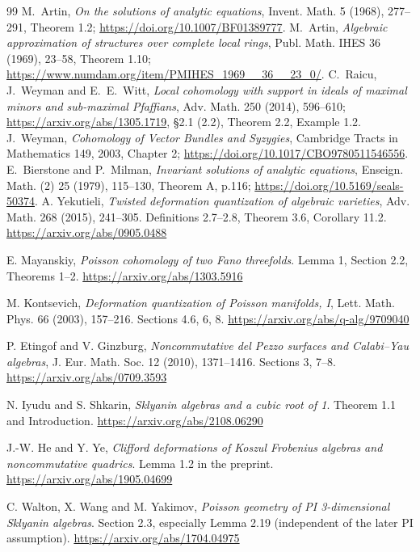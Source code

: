 \documentclass[a4paper,11pt]{ltjsarticle}
\theoremstyle{definition}
\begin{document}

\begin{thebibliography}{99}
\small
{} M.~Artin, \emph{On the solutions of analytic equations},
Invent. Math. 5 (1968), 277--291, Theorem 1.2;
\url{https://doi.org/10.1007/BF01389777}.
 M.~Artin, \emph{Algebraic approximation of structures over complete local rings},
Publ. Math. IHES 36 (1969), 23--58, Theorem 1.10;
\url{https://www.numdam.org/item/PMIHES_1969__36__23_0/}.
 C.~Raicu, J.~Weyman and E.~E.~Witt,
\emph{Local cohomology with support in ideals of maximal minors and sub-maximal Pfaffians},
Adv. Math. 250 (2014), 596--610; \url{https://arxiv.org/abs/1305.1719},
\S2.1 (2.2), Theorem 2.2, Example 1.2.
 J.~Weyman, \emph{Cohomology of Vector Bundles and Syzygies},
Cambridge Tracts in Mathematics 149, 2003, Chapter 2;
\url{https://doi.org/10.1017/CBO9780511546556}.
 E.~Bierstone and P.~Milman,
\emph{Invariant solutions of analytic equations}, Enseign. Math. (2) 25 (1979), 115--130,
Theorem A, p.116; \url{https://doi.org/10.5169/seals-50374}.
A. Yekutieli,
\emph{Twisted deformation quantization of algebraic varieties},
Adv. Math. 268 (2015), 241--305.
Definitions 2.7--2.8, Theorem 3.6, Corollary 11.2.
\url{https://arxiv.org/abs/0905.0488}

E. Mayanskiy,
\emph{Poisson cohomology of two Fano threefolds}.
Lemma 1, Section 2.2, Theorems 1--2.
\url{https://arxiv.org/abs/1303.5916}

M. Kontsevich,
\emph{Deformation quantization of Poisson manifolds, I},
Lett. Math. Phys. 66 (2003), 157--216.
Sections 4.6, 6, 8.
\url{https://arxiv.org/abs/q-alg/9709040}

P. Etingof and V. Ginzburg,
\emph{Noncommutative del Pezzo surfaces and Calabi--Yau algebras},
J. Eur. Math. Soc. 12 (2010), 1371--1416.
Sections 3, 7--8.
\url{https://arxiv.org/abs/0709.3593}

N. Iyudu and S. Shkarin,
\emph{Sklyanin algebras and a cubic root of 1}.
Theorem 1.1 and Introduction.
\url{https://arxiv.org/abs/2108.06290}

J.-W. He and Y. Ye,
\emph{Clifford deformations of Koszul Frobenius algebras and noncommutative quadrics}.
Lemma 1.2 in the preprint.
\url{https://arxiv.org/abs/1905.04699}

C. Walton, X. Wang and M. Yakimov,
\emph{Poisson geometry of PI 3-dimensional Sklyanin algebras}.
Section 2.3, especially Lemma 2.19 (independent of the later PI assumption).
\url{https://arxiv.org/abs/1704.04975}


\end{thebibliography}
\end{document}
